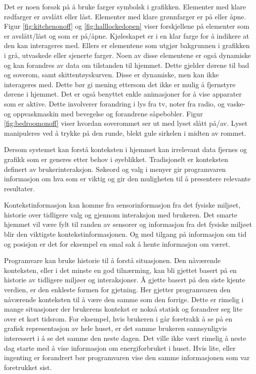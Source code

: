 Det er noen forsøk på å bruke farger symbolsk i grafikken. Elementer med klare rødfarger er avslått eller låst. Elementer med klare grønnfarger er på eller åpne. Figur \ref{fig:kitchenonoff} og \ref{fig:halllockedopen} viser forskjellene på elementer som er avslått/låst og som er på/åpne. Kjøleskapet er i en klar farge for å indikere at den kan interageres med. Ellers er elementene som utgjør bakgrunnen i grafikken i grå, utvaskede eller sjenerte farger. Noen av disse elementene er også dynamiske og kan forandres av data om tilstanden til hjemmet. Dette gjelder dørene til bad og soverom, samt skittentøyskurven. Disse er dynamiske, men kan ikke interageres med. Dette bør gi mening ettersom det ikke er mulig å fjernstyre dørene i hjemmet. Det er også benyttet enkle animasjoner for å vise apparater som er aktive. Dette involverer forandring i lys fra tv, noter fra radio, og vaske- og oppvaskmaskin med bevegelse og forandrene såpebobler. Figur \ref{fig:bedroomonoff} viser hvordan soverommet ser ut med lyset slått på/av. Lyset manipuleres ved å trykke på den runde, blekt gule sirkelen i midten av rommet.

Dersom systemet kan forstå konteksten i hjemmet kan irrelevant data fjernes og grafikk som er generes etter behov i øyeblikket. Tradisjonelt er konteksten definert av brukerinteraksjon. Søkeord og valg i menyer gir programvaren informasjon om hva som er viktig og gir den muligheten til å presentere relevante resultater.

Kontekstinformasjon kan komme fra sensorinformasjon fra det fysiske miljøet, historie over tidligere valg og gjennom interaksjon med brukeren. Det smarte hjemmet vil være fylt til randen av sensorer og informasjon fra det fysiske miljøet blir den viktigste kontekstinformasjonen. Og med tilgang på informasjon om tid og posisjon er det for eksempel en smal sak å hente informasjon om været.

Programvare kan bruke historie til å forstå situasjonen. Den nåværende konteksten, eller i det minste en god tilnærming, kan bli gjettet basert på en historie av tidligere miljøer og interaksjoner. Å gjette basert på den siste kjente verdien, er den enkleste formen for gjetning. Her gjetter programvaren den nåværende konteksten til å være den samme som den forrige. Dette er rimelig i mange situasjoner der brukerens kontekst er nokså statisk og forandrer seg lite over et kort tidsrom. For eksempel, hvis brukeren i går foretrakk å se på en grafisk representasjon av hele huset, er det samme brukeren sannsynligvis interessert i å se det samme den neste dagen. Det ville ikke vært rimelig å neste dag starte med å vise informasjon om energiforbruket i huset. Hvis lite, eller ingenting er forandrert bør programvaren vise den samme informasjonen som var foretrukket sist.

